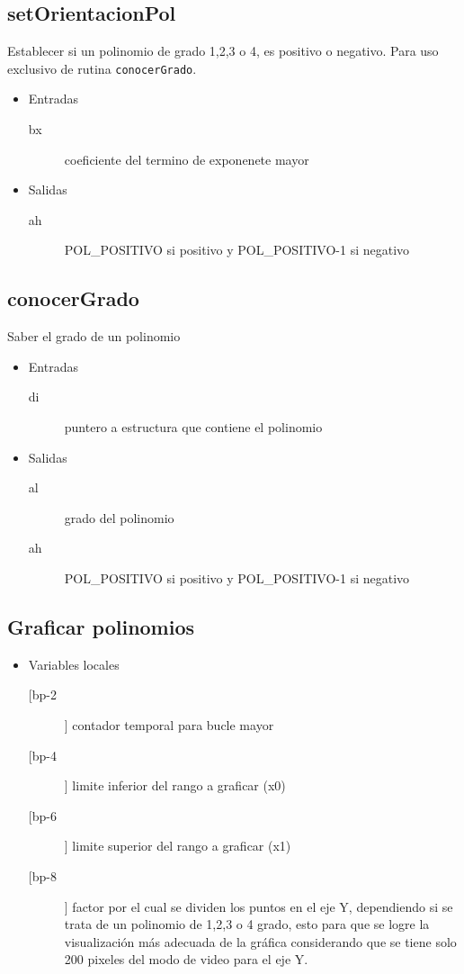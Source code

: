 \subsection{setOrientacionPol}
\label{sec-5-3}
Establecer si un polinomio de grado 1,2,3 o 4, es positivo
o negativo. Para uso exclusivo de rutina \texttt{conocerGrado}.
\begin{itemize}
\item Entradas
\begin{description}
\item[bx] coeficiente del termino de exponenete mayor
\end{description}
\item Salidas
\begin{description}
\item[ah] POL\_POSITIVO si positivo y POL\_POSITIVO-1 si
negativo
\end{description}
\end{itemize}


\subsection{conocerGrado}
\label{sec-5-4}
Saber el grado de un polinomio
\begin{itemize}
\item Entradas
\begin{description}
\item[di] puntero a estructura que contiene el polinomio
\end{description}
\item Salidas
\begin{description}
\item[al] grado del polinomio
\item[ah] POL\_POSITIVO si positivo y POL\_POSITIVO-1 si
negativo
\end{description}
\end{itemize}


\subsection{Graficar polinomios}
\label{sec-5-5}
\begin{itemize}
\item Variables locales
\begin{description}
\item[[bp-2]] contador temporal para bucle mayor
\item[[bp-4]] limite inferior del rango a graficar (x0)
\item[[bp-6]] limite superior del rango a graficar (x1)
\item[[bp-8]] factor por el cual se dividen los puntos en
el eje Y, dependiendo si se trata de un
polinomio de 1,2,3 o 4 grado, esto para que
se logre la visualización más adecuada de la
gráfica considerando que se tiene solo 200
pixeles del modo de video para el eje Y.
\end{description}
\end{itemize}


